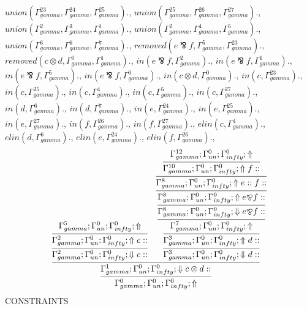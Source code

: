 \documentclass[a4paper, 11pt]{article}
\begin{document}
$union(\Gamma_{gamma}^{23}, \Gamma_{gamma}^{24}, \Gamma_{gamma}^{25}).$, $union(\Gamma_{gamma}^{25}, \Gamma_{gamma}^{26}, \Gamma_{gamma}^{27}).$, $union(\Gamma_{gamma}^{2}, \Gamma_{gamma}^{3}, \Gamma_{gamma}^{1}).$, $union(\Gamma_{gamma}^{2}, \Gamma_{gamma}^{4}, \Gamma_{gamma}^{5}).$, $union(\Gamma_{gamma}^{3}, \Gamma_{gamma}^{6}, \Gamma_{gamma}^{7}).$, $removed(e \bindnasrepma f, \Gamma_{gamma}^{5}, \Gamma_{gamma}^{23}).$, $removed(c \otimes d, \Gamma_{gamma}^{0}, \Gamma_{gamma}^{1}).$, $in(e \bindnasrepma f, \Gamma_{gamma}^{2}).$, $in(e \bindnasrepma f, \Gamma_{gamma}^{1}).$, $in(e \bindnasrepma f, \Gamma_{gamma}^{5}).$, $in(e \bindnasrepma f, \Gamma_{gamma}^{0}).$, $in(c \otimes d, \Gamma_{gamma}^{0}).$, $in(c, \Gamma_{gamma}^{23}).$, $in(c, \Gamma_{gamma}^{25}).$, $in(c, \Gamma_{gamma}^{4}).$, $in(c, \Gamma_{gamma}^{5}).$, $in(c, \Gamma_{gamma}^{27}).$, $in(d, \Gamma_{gamma}^{6}).$, $in(d, \Gamma_{gamma}^{7}).$, $in(e, \Gamma_{gamma}^{24}).$, $in(e, \Gamma_{gamma}^{25}).$, $in(e, \Gamma_{gamma}^{27}).$, $in(f, \Gamma_{gamma}^{26}).$, $in(f, \Gamma_{gamma}^{27}).$, $elin(c, \Gamma_{gamma}^{4}).$, $elin(d, \Gamma_{gamma}^{6}).$, $elin(e, \Gamma_{gamma}^{24}).$, $elin(f, \Gamma_{gamma}^{26}).$, 
\[
\infer{\Gamma_{ gamma}^{0} ; \Gamma_{un}^{0} ; \Gamma_{ infty}^{0} ;  \Uparrow }
{\infer{\Gamma_{ gamma}^{1} ; \Gamma_{un}^{0} ; \Gamma_{ infty}^{0} ;  \Downarrow c \otimes d :: }
{\infer{\Gamma_{ gamma}^{2} ; \Gamma_{un}^{0} ; \Gamma_{ infty}^{0} ;  \Downarrow c :: }
{\infer{\Gamma_{ gamma}^{2} ; \Gamma_{un}^{0} ; \Gamma_{ infty}^{0} ;  \Uparrow c :: }
{\Gamma_{ gamma}^{5} ; \Gamma_{un}^{0} ; \Gamma_{ infty}^{0} ;  \Uparrow }}
&
\infer{\Gamma_{ gamma}^{3} ; \Gamma_{un}^{0} ; \Gamma_{ infty}^{0} ;  \Downarrow d :: }
{\infer{\Gamma_{ gamma}^{3} ; \Gamma_{un}^{0} ; \Gamma_{ infty}^{0} ;  \Uparrow d :: }
{\infer{\Gamma_{ gamma}^{7} ; \Gamma_{un}^{0} ; \Gamma_{ infty}^{0} ;  \Uparrow }
{\infer{\Gamma_{ gamma}^{8} ; \Gamma_{un}^{0} ; \Gamma_{ infty}^{0} ;  \Downarrow e \bindnasrepma f :: }
{\infer{\Gamma_{ gamma}^{8} ; \Gamma_{un}^{0} ; \Gamma_{ infty}^{0} ;  \Uparrow e \bindnasrepma f :: }
{\infer{\Gamma_{ gamma}^{8} ; \Gamma_{un}^{0} ; \Gamma_{ infty}^{0} ;  \Uparrow e :: f :: }
{\infer{\Gamma_{ gamma}^{10} ; \Gamma_{un}^{0} ; \Gamma_{ infty}^{0} ;  \Uparrow f :: }
{\Gamma_{ gamma}^{12} ; \Gamma_{un}^{0} ; \Gamma_{ infty}^{0} ;  \Uparrow }}}}}}}}}
\]
CONSTRAINTS
\end{document}
